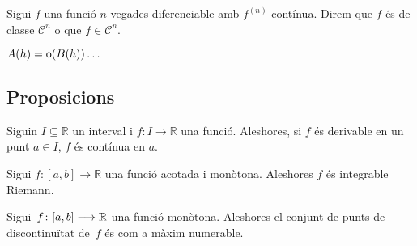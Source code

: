 \documentclass[../../Main.tex]{subfiles}
\begin{document}
	\begin{definition}
		\label{def:Classe de diferenciabilitat}
		Sigui \(f\) una funció \(n\)-vegades diferenciable amb \(f^{(n)}\) contínua. Direm que \(f\) és de classe \(\mathcal{C}^{n}\) o que \(f\in\mathcal{C}^{n}\).
	\end{definition}
	\begin{definition}[Derivada]
		\label{def:derivada}
	\end{definition}
	\begin{definition}
		\label{def:Landau}
		\(A(h)=\operatorname{o}(B(h))\dots\)
	\end{definition}
	\subsection{Proposicions}
	\begin{proposition}\label{prop:Derivable implica contínua}
		Siguin \(I\subseteq\mathbb{R}\) un interval i \(f\colon I\to\mathbb{R}\) una funció. Aleshores, si \(f\) és derivable en un punt \(a\in I\), \(f\) és contínua en \(a\).
	\end{proposition}
	\begin{proposition}
		Sigui \(f\colon[a,b]\to\mathbb{R}\) una funció acotada i monòtona. Aleshores \(f\) és integrable Riemann.
	\end{proposition}
	\begin{proposition}
		Sigui~\(f\colon[a,b]\longrightarrow\mathbb{R}\) una funció monòtona. Aleshores el conjunt de punts de discontinuïtat de~\(f\) és com a màxim numerable.
	\end{proposition}
\end{document}
